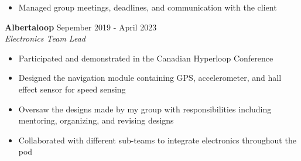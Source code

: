 \documentclass[10pt,letterpaper]{article}
\newcommand{\ExperienceHeader}[3] {
    \textbf{\large{#1} }
    \hfill
    {#3}\\
    \textit{#2}\\
    \vspace{-1em}
}
\begin{document}
\begin{paracol}{2}
\begin{rightcolumn}
\begin{itemize}
        \item Managed group meetings, deadlines, and communication with the client
    \end{itemize}
    \vspace{5pt}
    \ExperienceHeader{Albertaloop}{Electronics Team Lead}{Sepember 2019 - April 2023}
    \begin{itemize}
        \item Participated and demonstrated in the Canadian Hyperloop Conference
        \item Designed the navigation module containing GPS, accelerometer, and hall effect sensor for speed sensing
        \item Oversaw the designs made by my group with responsibilities including \\mentoring, organizing, and revising designs
        \item Collaborated with different sub-teams to integrate electronics throughout the pod
    \end{itemize}
\end{rightcolumn}
\end{paracol}
\end{document}
